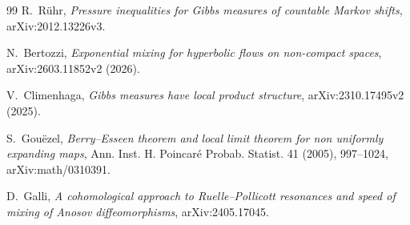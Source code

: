 \documentclass[11pt]{article}
\begin{document}
\begin{thebibliography}{99}
R.~R\"uhr,
\emph{Pressure inequalities for Gibbs measures of countable Markov shifts},
arXiv:2012.13226v3.

N.~Bertozzi,
\emph{Exponential mixing for hyperbolic flows on non-compact spaces},
arXiv:2603.11852v2 (2026).

V.~Climenhaga,
\emph{Gibbs measures have local product structure},
arXiv:2310.17495v2 (2025).

S.~Gou\"ezel,
\emph{Berry--Esseen theorem and local limit theorem for non uniformly
expanding maps}, Ann. Inst. H. Poincar\'e Probab. Statist. 41 (2005),
997--1024, arXiv:math/0310391.

D.~Galli,
\emph{A cohomological approach to Ruelle--Pollicott resonances and speed of
mixing of Anosov diffeomorphisms}, arXiv:2405.17045.
\end{thebibliography}
\endgroup
\end{document}
